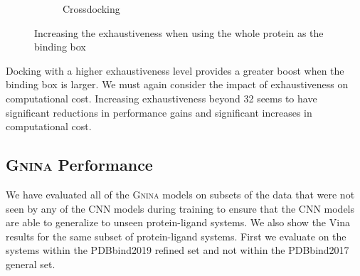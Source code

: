 \documentclass[journal=jcisd8,manuscript=article]{achemso}
\begin{document}
\begin{figure}
\begin{subfigure}[b]{0.48\textwidth}
    		\caption{Crossdocking}
                \label{fig:WholeProteinExhCD}
        \end{subfigure}    
	\caption{Increasing the exhaustiveness when using the whole protein as the binding box}
        \label{fig:WholeProteinExh}
\end{figure}
Docking with a higher exhaustiveness level provides a greater boost when the binding box is larger. We must again consider the impact of exhaustiveness on computational cost. Increasing exhaustiveness beyond 32 seems to have significant reductions in performance gains and significant increases in computational cost. 

\subsection{\textsc{Gnina} Performance}
We have evaluated all of the \textsc{Gnina} models on subsets of the data that were not seen by any of the CNN models during training to ensure that the CNN models are able to generalize to unseen protein-ligand systems. We also show the Vina results for the same subset of protein-ligand systems. First we evaluate on the systems within the PDBbind2019 refined set and not within the PDBbind2017 general set.
\end{document}
